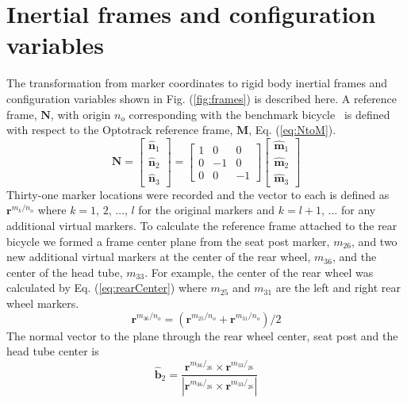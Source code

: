 \section{Inertial frames and configuration variables}
\label{sec:inFrames}
The transformation from marker coordinates to rigid body inertial frames and configuration variables shown in Fig. (\ref{fig:frames}) is described here. A reference frame, $\mathbf{N}$, with origin $n_o$ corresponding with the benchmark bicycle~\cite{Meijaard2007} is defined with respect to the Optotrack reference frame, $\mathbf{M}$, Eq. (\ref{eq:NtoM}).
\begin{equation}
    \mathbf{N}=
    \left[
    \begin{array}{c}
    \hat{\mathbf{n}}_1\\
    \hat{\mathbf{n}}_2\\
    \hat{\mathbf{n}}_3
  \end{array}
    \right]
    =
    \left[
    \begin{array}{rrr}
    1 &  0 &  0\\
    0 & -1 &  0\\
    0 &  0 & -1
    \end{array}
    \right]
    \left[
    \begin{array}{c}
    \hat{\mathbf{m}}_1\\
    \hat{\mathbf{m}}_2\\
    \hat{\mathbf{m}}_3
  \end{array}
    \right]
\label{eq:NtoM}
\end{equation}
Thirty-one marker locations were recorded and the vector to each is defined as $\mathbf{r}^{{m_{k}}/{n_o}}$ where $k=1$, $2$, $\ldots$, $l$ for the original markers and $k=l+1$, $\ldots$ for any additional virtual markers.  To calculate the reference frame attached to the rear bicycle we formed a frame center plane from the seat post marker, $m_{26}$, and two new additional virtual markers at the center of the rear wheel, $m_{36}$, and the center of the head tube, $m_{33}$. For example, the center of the rear wheel was calculated by Eq. (\ref{eq:rearCenter}) where $m_{25}$ and $m_{31}$ are the left and right rear wheel markers.
\begin{equation}
    \mathbf{r}^{{m_{36}}/{n_o}}=(\mathbf{r}^{{m_{25}}/{n_o}}+\mathbf{r}^{{m_{31}}/{n_o}})/2
\label{eq:rearCenter}
\end{equation}
The normal vector to the plane through the rear wheel center, seat post and the head tube center is
\begin{equation}
\hat{\mathbf{b}}_2=\frac{\mathbf{r}^{{m_{36}}/_{26}}\times\mathbf{r}^{{m_{33}}/_{26}}}{|\mathbf{r}^{{m_{36}}/_{26}}\times\mathbf{r}^{{m_{33}}/_{26}}|}
\label{eq:b2}
\end{equation}
